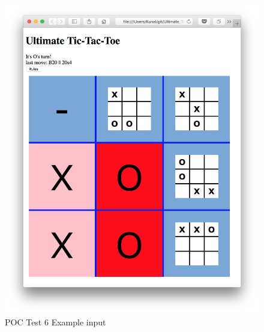 \documentclass[12pt, titlepage]{article}
\begin{document}
\begin{figure}
  \includegraphics[width=\linewidth]{Figures/Test6-input.png}
  \caption{POC Test 6 Example input}
  \label{fig:Test6_intput}
\end{figure}
\end{document}
